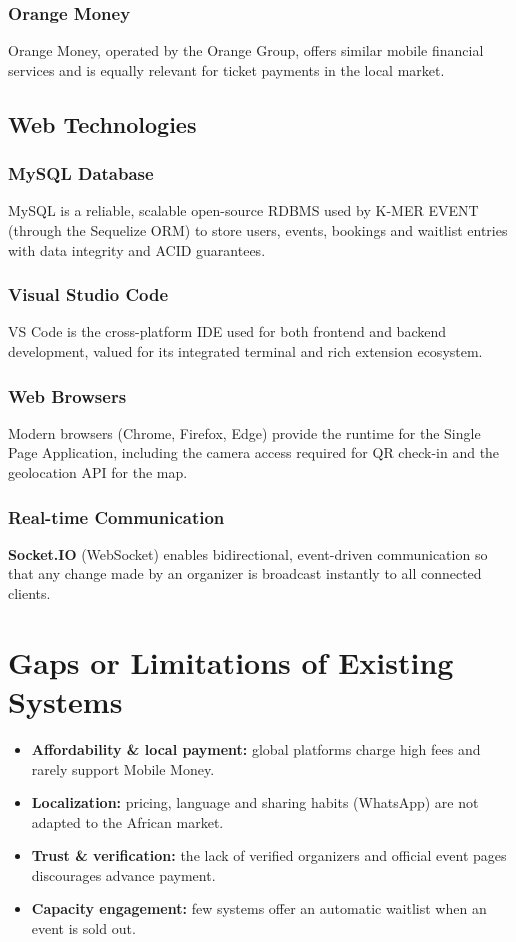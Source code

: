 \documentclass[12pt,a4paper]{report}
\begin{document}
\subsubsection{Orange Money}
Orange Money, operated by the Orange Group, offers similar mobile financial services and is
equally relevant for ticket payments in the local market.

\subsection{Web Technologies}
\subsubsection{MySQL Database}
MySQL is a reliable, scalable open-source RDBMS used by K-MER EVENT (through the Sequelize
ORM) to store users, events, bookings and waitlist entries with data integrity and ACID
guarantees.

\subsubsection{Visual Studio Code}
VS Code is the cross-platform IDE used for both frontend and backend development, valued for
its integrated terminal and rich extension ecosystem.

\subsubsection{Web Browsers}
Modern browsers (Chrome, Firefox, Edge) provide the runtime for the Single Page Application,
including the camera access required for QR check-in and the geolocation API for the map.

\subsubsection{Real-time Communication}
\textbf{Socket.IO} (WebSocket) enables bidirectional, event-driven communication so that any
change made by an organizer is broadcast instantly to all connected clients.

\section{Gaps or Limitations of Existing Systems}
\begin{itemize}
  \item \textbf{Affordability \& local payment:} global platforms charge high fees and rarely
        support Mobile Money.
  \item \textbf{Localization:} pricing, language and sharing habits (WhatsApp) are not adapted
        to the African market.
  \item \textbf{Trust \& verification:} the lack of verified organizers and official event
        pages discourages advance payment.
  \item \textbf{Capacity engagement:} few systems offer an automatic waitlist when an event is
        sold out.
\end{itemize}
\end{document}
